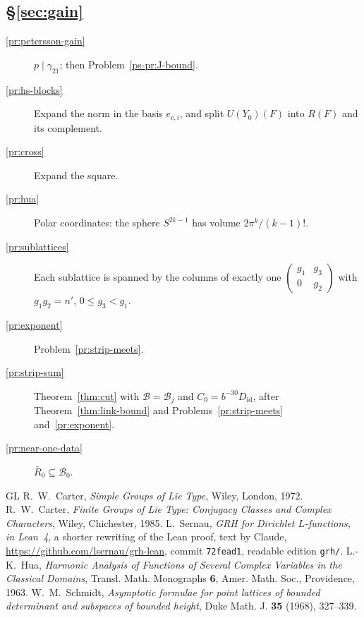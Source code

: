 \documentclass[reqno]{amsart}
\theoremstyle{definition}
\theoremstyle{plain}
\theoremstyle{remark}
\newcommand{\Bc}{\mathcal B}
\newcommand{\Rb}{\bar R_0}
\newcommand{\Did}{D_{\mathrm{id}}}
\begin{document}
\subsection*{\S\ref{sec:gain}}
\begin{description}
\item[\ref{pr:petersson-gain}] \(p\mid\gamma_{21}\); then Problem~\ref{ps-pr:J-bound}.
\item[\ref{pr:hs-blocks}] Expand the norm in the basis \(e_{c,i}\), and split \(U(Y_0)(F)\) into \(R(F)\) and its complement.
\item[\ref{pr:cross}] Expand the square.
\item[\ref{pr:hua}] Polar coordinates: the sphere \(S^{2k-1}\) has volume \(2\pi^k/(k-1)!\).
\item[\ref{pr:sublattices}] Each sublattice is spanned by the columns of exactly one \(\left(\begin{smallmatrix}g_1&g_3\\0&g_2\end{smallmatrix}\right)\) with \(g_1g_2=n'\), \(0\le g_3<g_1\).
\item[\ref{pr:exponent}] Problem~\ref{pr:strip-meets}.
\item[\ref{pr:strip-sum}] Theorem~\ref{thm:cut} with \(\Bc=\Bc_j\) and \(C_0=b^{-30}\Did\), after Theorem~\ref{thm:link-bound} and Problems~\ref{pr:strip-meets} and~\ref{pr:exponent}.
\item[\ref{pr:near-one-data}] \(\Rb\subseteq\Bc_0\).
\end{description}

\begin{thebibliography}{GL}
 R.~W.~Carter, \emph{Simple Groups of Lie Type}, Wiley, London, 1972.
 R.~W.~Carter, \emph{Finite Groups of Lie Type: Conjugacy Classes and Complex Characters}, Wiley, Chichester, 1985.
 L.~Sernau, \emph{GRH for Dirichlet \(L\)-functions, in Lean~4}, a shorter rewriting of the Lean proof, text by Claude, \url{https://github.com/lsernau/grh-lean}, commit \texttt{72fead1}, readable edition \texttt{grh/}.
 L.-K.~Hua, \emph{Harmonic Analysis of Functions of Several Complex Variables in the Classical Domains}, Transl. Math. Monographs \textbf{6}, Amer. Math. Soc., Providence, 1963.
 W.~M.~Schmidt, \emph{Asymptotic formulae for point lattices of bounded determinant and subspaces of bounded height}, Duke Math. J. \textbf{35} (1968), 327--339.
\end{thebibliography}
\end{document}

